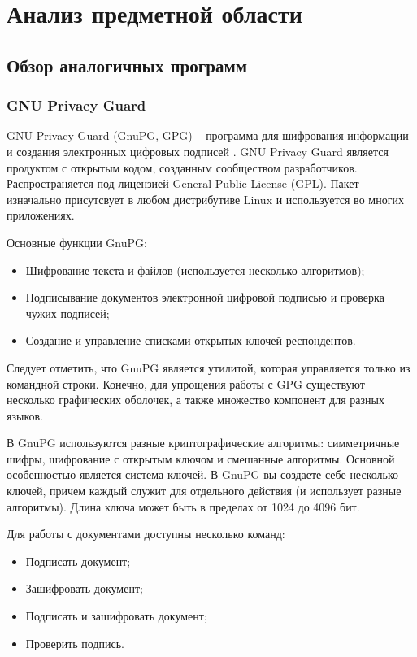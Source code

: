 \newpage
\section{Анализ предметной области}\label{sec:razd1}

\subsection{Обзор аналогичных программ}
\label{ssec:obzor}

\subsubsection{GNU Privacy Guard}


GNU Privacy Guard (GnuPG, GPG) -- программа для шифрования
информации и создания электронных цифровых подписей \cite{gnupg}.
GNU Privacy Guard является продуктом с открытым кодом, созданным
сообществом разработчиков.
Распространяется под лицензией General Public License (GPL).
Пакет изначально присутсвует в любом дистрибутиве Linux и
используется во многих приложениях.

Основные функции GnuPG:
\begin{itemize}
    \item Шифрование текста и файлов (используется несколько алгоритмов);
    \item Подписывание документов электронной цифровой подписью и проверка чужих подписей;
    \item Создание и управление списками открытых ключей респондентов.
\end{itemize}

Следует отметить, что GnuPG является утилитой, которая управляется только из
командной строки. Конечно, для упрощения работы с GPG существуют несколько
графических оболочек, а также множество компонент для разных языков.

В GnuPG используются разные криптографические алгоритмы: симметричные шифры,
шифрование с открытым ключом и смешанные алгоритмы.
Основной особенностью является система ключей. В GnuPG вы создаете себе несколько
ключей, причем каждый служит для отдельного действия (и использует разные
алгоритмы). Длина ключа может быть в пределах от 1024 до 4096 бит.

Для работы с документами доступны несколько команд:
\begin{itemize}
    \item Подписать документ;
    \item Зашифровать документ;
    \item Подписать и зашифровать документ;
    \item Проверить подпись.
\end{itemize}

